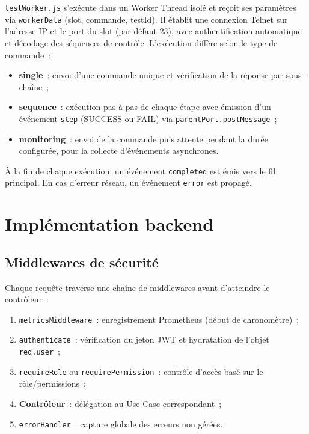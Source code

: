 \texttt{testWorker.js} s'exécute dans un Worker Thread isolé et reçoit ses paramètres
via \texttt{workerData} (slot, commande, testId). Il établit une connexion Telnet sur
l'adresse IP et le port du slot (par défaut 23), avec authentification automatique et
décodage des séquences de contrôle. L'exécution diffère selon le type de commande~:
\begin{itemize}
  \item \textbf{single}~: envoi d'une commande unique et vérification de la réponse
        par sous-chaîne~;
  \item \textbf{sequence}~: exécution pas-à-pas de chaque étape avec émission d'un
        événement \texttt{step} (SUCCESS ou FAIL) via \texttt{parentPort.postMessage}~;
  \item \textbf{monitoring}~: envoi de la commande puis attente pendant la durée
        configurée, pour la collecte d'événements asynchrones.
\end{itemize}
À la fin de chaque exécution, un événement \texttt{completed} est émis vers le fil
principal. En cas d'erreur réseau, un événement \texttt{error} est propagé.

\section{Implémentation backend}

\subsection{Middlewares de sécurité}

Chaque requête traverse une chaîne de middlewares avant d'atteindre le
contrôleur~:

\begin{enumerate}
  \item \texttt{metricsMiddleware}~: enregistrement Prometheus (début de
        chronomètre)~;
  \item \texttt{authenticate}~: vérification du jeton JWT et hydratation
        de l'objet \texttt{req.user}~;
  \item \texttt{requireRole} ou \texttt{requirePermission}~: contrôle
        d'accès basé sur le rôle/permissions~;
  \item \textbf{Contrôleur}~: délégation au Use Case correspondant~;
  \item \texttt{errorHandler}~: capture globale des erreurs non gérées.
\end{enumerate}

